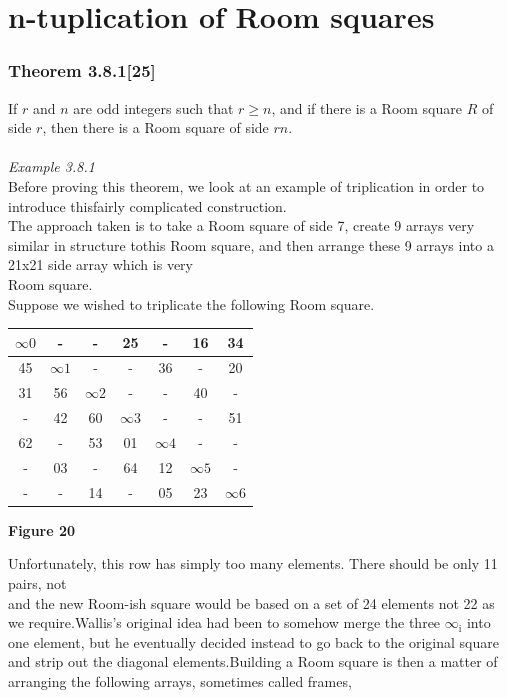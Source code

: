 \documentclass[
  12pt,
  a4paper]{book}
\begin{document}
\hypertarget{n-tuplication-of-room-squares}{%
\section{n-tuplication of Room squares}\label{n-tuplication-of-room-squares}}

\hypertarget{theorem-3.8.125}{%
\subsubsection{Theorem 3.8.1{[}25{]}}\label{theorem-3.8.125}}

If \(r\) and \(n\) are odd integers such that \(r \geq n\), and if there is a
Room square \(R\) of side \(r\), then there is a Room square of side \(rn\).\\
~\\
\emph{Example 3.8.1}\\
Before proving this theorem, we look at an example of triplication in
order to introduce thisfairly complicated construction.\\
The approach taken is to take a Room square of side 7, create 9 arrays
very similar in structure tothis Room square, and then arrange these 9
arrays into a 21x21 side array which is very\\
Room square.\\
Suppose we wished to triplicate the following Room square.

\begin{longtable}[]{@{}ccccccc@{}}
\toprule
\(\infty 0\) & - & - & 25 & - & 16 & 34\tabularnewline
\midrule
\endhead
45 & \(\infty 1\) & - & - & 36 & - & 20\tabularnewline
31 & 56 & \(\infty 2\) & - & - & 40 & -\tabularnewline
- & 42 & 60 & \(\infty 3\) & - & - & 51\tabularnewline
62 & - & 53 & 01 & \(\infty 4\) & - & -\tabularnewline
- & 03 & - & 64 & 12 & \(\infty 5\) & -\tabularnewline
- & - & 14 & - & 05 & 23 & \(\infty 6\)\tabularnewline
\bottomrule
\end{longtable}

\textbf{Figure 20}

Unfortunately, this row has simply too many elements. There should be
only 11 pairs, not\\
and the new Room-ish square would be based on a set of 24 elements not
22 as we require.Wallis's original idea had been to somehow merge the
three \(\infty _\mathrm{i}\) into one element, but he eventually decided
instead to go back to the original square and strip out the diagonal
elements.Building a Room square is then a matter of arranging the
following arrays, sometimes called frames,
\end{document}

